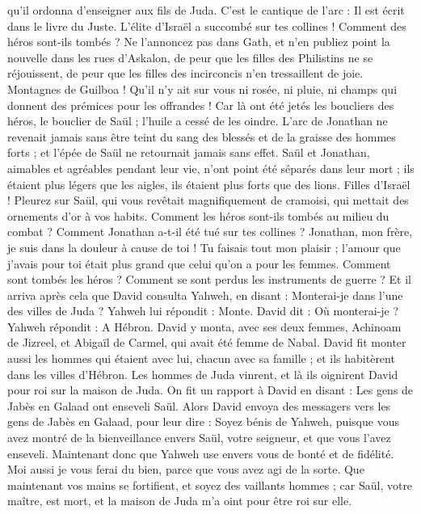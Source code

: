 \begin{multicols}{2}
qu’il ordonna d’enseigner aux fils de Juda. C’est le cantique de l'arc : Il est écrit dans le livre du Juste.
L'élite d'Israël a succombé sur tes collines ! Comment des héros sont-ils tombés ?
Ne l’annoncez pas dans Gath, et n'en publiez point la nouvelle dans les rues d'Askalon, de peur que les filles des Philistins ne se réjouissent, de peur que les filles des incirconcis n’en tressaillent de joie.
Montagnes de Guilboa ! Qu’il n’y ait sur vous ni rosée, ni pluie, ni champs qui donnent des prémices pour les offrandes ! Car là ont été jetés les boucliers des héros, le bouclier de Saül ; l'huile a cessé de les oindre.
L'arc de Jonathan ne revenait jamais sans être teint du sang des blessés et de la graisse des hommes forts ; et l'épée de Saül ne retournait jamais sans effet.
Saül et Jonathan, aimables et agréables pendant leur vie, n'ont point été séparés dans leur mort ; ils étaient plus légers que les aigles, ils étaient plus forts que des lions.
Filles d'Israël ! Pleurez sur Saül, qui vous revêtait magnifiquement de cramoisi, qui mettait des ornements d’or à vos habits.
Comment les héros sont-ils tombés au milieu du combat ? Comment Jonathan a-t-il été tué sur tes collines ?
Jonathan, mon frère, je suis dans la douleur à cause de toi ! Tu faisais tout mon plaisir ; l'amour que j'avais pour toi était plus grand que celui qu’on a pour les femmes.
Comment sont tombés les héros ? Comment se sont perdus les instruments de guerre ?
\VerseOne{}Et il arriva après cela que David consulta Yahweh, en disant : Monterai-je dans l’une des villes de Juda ? Yahweh lui répondit : Monte. David dit : Où monterai-je ? Yahweh répondit : A Hébron.
David y monta, avec ses deux femmes, Achinoam de Jizreel, et Abigaïl de Carmel, qui avait été femme de Nabal.
David fit monter aussi les hommes qui étaient avec lui, chacun avec sa famille ; et ils habitèrent dans les villes d’Hébron.
Les hommes de Juda vinrent, et là ils oignirent David pour roi sur la maison de Juda. On fit un rapport à David en disant : Les gens de Jabès en Galaad ont enseveli Saül.
Alors David envoya des messagers vers les gens de Jabès en Galaad, pour leur dire : Soyez bénis de Yahweh, puisque vous avez montré de la bienveillance envers Saül, votre seigneur, et que vous l'avez enseveli.
Maintenant donc que Yahweh use envers vous de bonté et de fidélité. Moi aussi je vous ferai du bien, parce que vous avez agi de la sorte.
Que maintenant vos mains se fortifient, et soyez des vaillants hommes ; car Saül, votre maître, est mort, et la maison de Juda m'a oint pour être roi sur elle.

\end{multicols}
